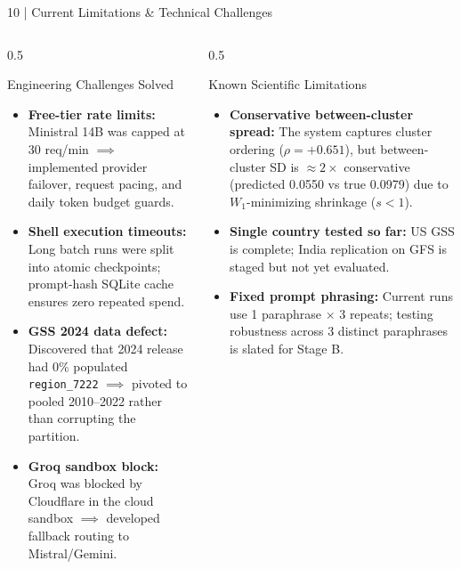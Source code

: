 \documentclass[10pt,aspectratio=169]{beamer}
\begin{document}
\begin{frame}{10 | Current Limitations \& Technical Challenges}
    \scriptsize
    \begin{columns}[T]
        \begin{column}{0.5\textwidth}
            \begin{block}{Engineering Challenges Solved}
                \tiny
                \begin{itemize}\itemsep4pt
                    \item \textbf{Free-tier rate limits:} Ministral 14B was capped at 30 req/min $\implies$ implemented provider failover, request pacing, and daily token budget guards.
                    \item \textbf{Shell execution timeouts:} Long batch runs were split into atomic checkpoints; prompt-hash SQLite cache ensures zero repeated spend.
                    \item \textbf{GSS 2024 data defect:} Discovered that 2024 release had 0\% populated \texttt{region\_7222} $\implies$ pivoted to pooled 2010--2022 rather than corrupting the partition.
                    \item \textbf{Groq sandbox block:} Groq was blocked by Cloudflare in the cloud sandbox $\implies$ developed fallback routing to Mistral/Gemini.
                \end{itemize}
            \end{block}
        \end{column}
        \begin{column}{0.5\textwidth}
            \begin{block}{Known Scientific Limitations}
                \tiny
                \begin{itemize}\itemsep4pt
                    \item \textbf{Conservative between-cluster spread:} The system captures cluster ordering ($\rho = +0.651$), but between-cluster SD is $\approx 2\times$ conservative (predicted 0.0550 vs true 0.0979) due to $W_1$-minimizing shrinkage ($s < 1$).
                    \item \textbf{Single country tested so far:} US GSS is complete; India replication on GFS is staged but not yet evaluated.
                    \item \textbf{Fixed prompt phrasing:} Current runs use 1 paraphrase $\times$ 3 repeats; testing robustness across 3 distinct paraphrases is slated for Stage B.
                \end{itemize}
            \end{block}
        \end{column}
    \end{columns}
\end{frame}
\end{document}
